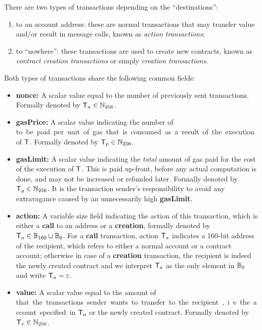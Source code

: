 There are two types of transactions depending on the ``destinations'': 
\begin{enumerate}[nosep]
	\item {to an account address:} these are normal transactions that may transfer value and/or result in message calls, known as \emph{action transactions};

	\item {to ``nowhere'':} these transactions are used to create new contracts, known as \emph{contract creation transactions} or simply \emph{creation transactions}.
\end{enumerate}
Both types of transactions share the following common fields:
\begin{itemize} [nosep]
	\item {\bf nonce:} A scalar value equal to the number of previously sent transactions. Formally denoted by $\textsf{T}_n \in\mathbb{N}_{256}$.

	\item {\bf gasPrice:} A scalar value indicating the number of \unit to be paid per unit of gas that is consumed as a result of the execution of $\textsf{T}$. Formally denoted by $\textsf{T}_p\in\mathbb{N}_{256}$.

	\item {\bf gasLimit:} A scalar value indicating the \emph{total} amount of gas paid for the cost of the execution of $\textsf{T}$. This is paid up-front, before any actual computation is done, and may not be increased or refunded later. 
	Formally denoted by $\textsf{T}_g\in\mathbb{N}_{256}$.
	It is the transaction sender's responsibility to avoid any extravagance caused by an unnecessarily high {\bf gasLimit}.

	\item {\bf action:} 
	A variable size field indicating the action of this transaction, which is either a \textbf{call} to an address or a \textbf{creation}, formally denoted by $\textsf{T}_a\in \mathbb{B}_{160}\cup\mathbb{B}_0$. 
	For a \textbf{call} transaction, action $\textsf{T}_a$ indicates a $160$-bit address of the recipient, which refers to either a normal account or a contract account;
	otherwise in case of a \textbf{creation} transaction, the recipient is indeed the newly created contract and we interpret $\textsf{T}_a$ as the only element in $\mathbb{B}_0$ and write $\textsf{T}_a = \mathbb{\varepsilon}$.

	\item {\bf value:} A scalar value equal to the amount of \unit that the transactions sender wants to transfer to the recipient, i.e. the account specified in $\textsf{T}_a$ or the newly created contract.
	Formally denoted by $\textsf{T}_v\in\mathbb{N}_{256}$.



\end{itemize}
